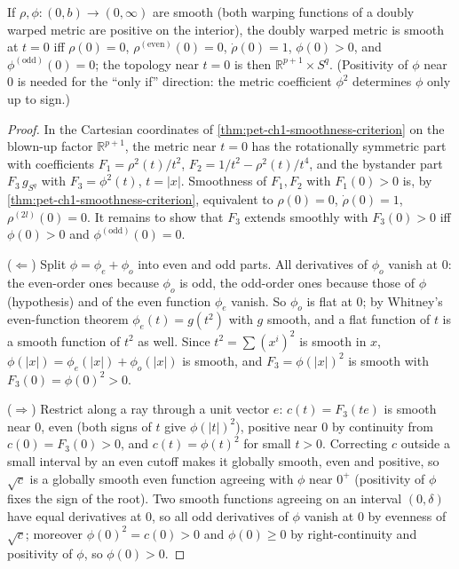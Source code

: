\begin{proposition}[Proposition 1.4.7 — smoothness at $t=0$]
  \label{prop:pet-ch1-doubly-warped-smooth-zero}
  \leanok
  If $\rho,\phi:(0,b)\to(0,\infty)$ are smooth (both warping functions of a
  doubly warped metric are positive on the interior), the doubly warped
  metric is smooth at $t=0$ iff $\rho(0)=0$, $\rho^{(\mathrm{even})}(0)=0$,
  $\dot\rho(0)=1$, $\phi(0)>0$, and $\phi^{(\mathrm{odd})}(0)=0$; the topology
  near $t=0$ is then $\mathbb{R}^{p+1}\times S^q$. (Positivity of $\phi$ near
  $0$ is needed for the ``only if'' direction: the metric coefficient
  $\phi^2$ determines $\phi$ only up to sign.)
\end{proposition}
\begin{proof}
  \leanok
  In the Cartesian coordinates of \cref{thm:pet-ch1-smoothness-criterion} on
  the blown-up factor $\mathbb{R}^{p+1}$, the metric near $t=0$ has the
  rotationally symmetric part with coefficients
  $F_1=\rho^2(t)/t^2$, $F_2=1/t^2-\rho^2(t)/t^4$, and the bystander part
  $F_3\,g_{S^q}$ with $F_3=\phi^2(t)$, $t=|x|$. Smoothness of $F_1,F_2$ with
  $F_1(0)>0$ is, by \cref{thm:pet-ch1-smoothness-criterion}, equivalent to
  $\rho(0)=0$, $\dot\rho(0)=1$, $\rho^{(2l)}(0)=0$. It remains to show that
  $F_3$ extends smoothly with $F_3(0)>0$ iff $\phi(0)>0$ and
  $\phi^{(\mathrm{odd})}(0)=0$.

  ($\Leftarrow$) Split $\phi=\phi_e+\phi_o$ into even and odd parts. All
  derivatives of $\phi_o$ vanish at $0$: the even-order ones because $\phi_o$
  is odd, the odd-order ones because those of $\phi$ (hypothesis) and of the
  even function $\phi_e$ vanish. So $\phi_o$ is flat at $0$; by Whitney's
  even-function theorem $\phi_e(t)=g(t^2)$ with $g$ smooth, and a flat
  function of $t$ is a smooth function of $t^2$ as well. Since
  $t^2=\sum(x^i)^2$ is smooth in $x$, $\phi(|x|)=\phi_e(|x|)+\phi_o(|x|)$ is
  smooth, and $F_3=\phi(|x|)^2$ is smooth with $F_3(0)=\phi(0)^2>0$.

  ($\Rightarrow$) Restrict along a ray through a unit vector $e$:
  $c(t)=F_3(te)$ is smooth near $0$, even (both signs of $t$ give
  $\phi(|t|)^2$), positive near $0$ by continuity from $c(0)=F_3(0)>0$, and
  $c(t)=\phi(t)^2$ for small $t>0$. Correcting $c$ outside a small interval
  by an even cutoff makes it globally smooth, even and positive, so
  $\sqrt{c}$ is a globally smooth even function agreeing with $\phi$ near
  $0^+$ (positivity of $\phi$ fixes the sign of the root). Two smooth
  functions agreeing on an interval $(0,\delta)$ have equal derivatives at
  $0$, so all odd derivatives of $\phi$ vanish at $0$ by evenness of
  $\sqrt{c}$; moreover $\phi(0)^2=c(0)>0$ and $\phi(0)\ge0$ by
  right-continuity and positivity of $\phi$, so $\phi(0)>0$.
\end{proof}

